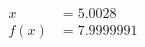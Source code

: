 \documentclass[preview]{standalone}
\begin{document}
\begin{align*}
x &= 5.0028\\f(x) &= 7.9999991
\end{align*}
\end{document}
